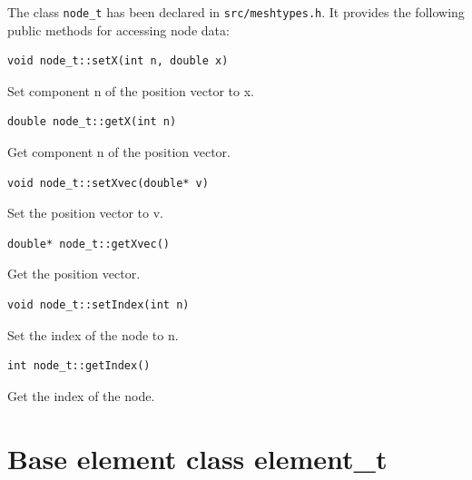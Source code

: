 The class {\tt node\_t} has been declared in {\tt src/meshtypes.h}. It provides the
following public methods for accessing node data:
\begin{verbatim}
void node_t::setX(int n, double x)
\end{verbatim}
Set component n of the position vector to x.
\begin{verbatim} 
double node_t::getX(int n)
\end{verbatim}
Get component n of the position vector.
\begin{verbatim} 
void node_t::setXvec(double* v)
\end{verbatim}
Set the position vector to v.
\begin{verbatim} 
double* node_t::getXvec()
\end{verbatim}
Get the position vector.
\begin{verbatim}
void node_t::setIndex(int n)
\end{verbatim}
Set the index of the node to n.
\begin{verbatim} 
int node_t::getIndex()
\end{verbatim}
Get the index of the node.

\section{Base element class element\_t}

